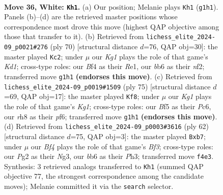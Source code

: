 \documentclass[11pt]{article}
\begin{document}
\clearpage

\begin{figure}[p]\centering
\begin{subfigure}{0.46\textwidth}\centering
\resizebox{\linewidth}{!}{%
\newchessgame
\chessboard[
  setfen={r5nr/p4k1p/1b6/5B2/2p2B2/PP5P/R1P3P1/1R4K1 w - - 0 36},
  showmover=false,
  pgfstyle=straightmove, color=movearrow, markmove={g1-h1}
]}
\caption{}
\end{subfigure}\hfill
\begin{subfigure}{0.46\textwidth}\centering
\resizebox{\linewidth}{!}{%
\newchessgame
\chessboard[
  setfen={6k1/2b3pp/1N6/3p4/P2B4/1P2P1n1/5nr1/R2KR3 w - - 1 36},
  showmover=false,
  pgfstyle=straightmove, color=movearrow, markmove={d1-c2}
]}
\caption{}
\end{subfigure}
\\[4pt]
\begin{subfigure}{0.46\textwidth}\centering
\resizebox{\linewidth}{!}{%
\newchessgame
\chessboard[
  setfen={r3b1k1/p4p1B/2p2P1R/1p4r1/3P2p1/2P3P1/8/5RK1 b - - 2 38},
  showmover=false,
  pgfstyle=straightmove, color=movearrow, markmove={g8-f8}
]}
\caption{}
\end{subfigure}\hfill
\begin{subfigure}{0.46\textwidth}\centering
\resizebox{\linewidth}{!}{%
\newchessgame
\chessboard[
  setfen={7k/pp3p2/4b1p1/2r1P3/2n2r2/P4BNP/4R1P1/R5K1 w - - 4 32},
  showmover=false,
  pgfstyle=straightmove, color=movearrow, markmove={f3-b7}
]}
\caption{}
\end{subfigure}
\caption{\textbf{Move 36, White: \texttt{Kh1}.} (a) Our position; Melanie plays \texttt{Kh1} (\texttt{g1h1}). Panels (b)--(d) are the retrieved master positions whose correspondence most drove this move (highest QAP objective among those that transfer to it). (b) Retrieved from \texttt{lichess\_elite\_2024-09\_p0021\#276} (ply 70) [structural distance $d$=76, QAP obj=30]: the master played \texttt{Kc2}; under $\mu$ our \emph{Kg1} plays the role of that game's \emph{Kd1}; cross-type roles: our \emph{B}f4 as their \emph{R}e1, our \emph{b}b6 as their \emph{n}f2; transferred move \texttt{g1h1} \textbf{(endorses this move)}. (c) Retrieved from \texttt{lichess\_elite\_2024-09\_p0019\#1509} (ply 75) [structural distance $d$=69, QAP obj=17]: the master played \texttt{Kf8}; under $\mu$ our \emph{Kg1} plays the role of that game's \emph{Kg1}; cross-type roles: our \emph{B}f5 as their \emph{P}c6, our \emph{r}h8 as their \emph{p}f6; transferred move \texttt{g1h1} \textbf{(endorses this move)}. (d) Retrieved from \texttt{lichess\_elite\_2024-09\_p0003\#3616} (ply 62) [structural distance $d$=75, QAP obj=3]: the master played \texttt{Bxb7}; under $\mu$ our \emph{Bf4} plays the role of that game's \emph{Bf3}; cross-type roles: our \emph{P}g2 as their \emph{N}g3, our \emph{b}b6 as their \emph{P}h3; transferred move \texttt{f4e3}. Synthesis: 3 retrieved analogs transferred to \texttt{Kh1} (summed QAP objective 77, the strongest correspondence among the candidate moves); Melanie committed it via the \texttt{search} selector.}
\label{fig:thought-m70}
\end{figure}
\end{document}
